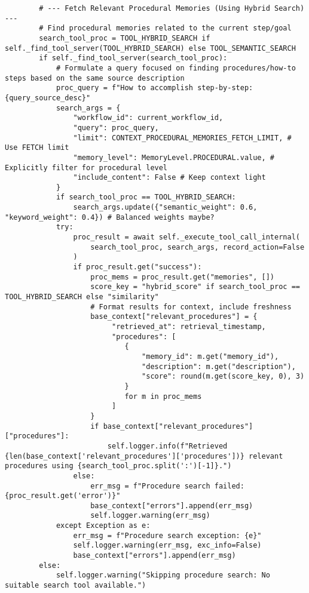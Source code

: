\documentclass[12pt,a4paper]{article}
\begin{document}
\begin{pageablecode}
\begin{verbatim}
        # --- Fetch Relevant Procedural Memories (Using Hybrid Search) ---
        # Find procedural memories related to the current step/goal
        search_tool_proc = TOOL_HYBRID_SEARCH if self._find_tool_server(TOOL_HYBRID_SEARCH) else TOOL_SEMANTIC_SEARCH
        if self._find_tool_server(search_tool_proc):
            # Formulate a query focused on finding procedures/how-to steps based on the same source description
            proc_query = f"How to accomplish step-by-step: {query_source_desc}"
            search_args = {
                "workflow_id": current_workflow_id,
                "query": proc_query,
                "limit": CONTEXT_PROCEDURAL_MEMORIES_FETCH_LIMIT, # Use FETCH limit
                "memory_level": MemoryLevel.PROCEDURAL.value, # Explicitly filter for procedural level
                "include_content": False # Keep context light
            }
            if search_tool_proc == TOOL_HYBRID_SEARCH:
                search_args.update({"semantic_weight": 0.6, "keyword_weight": 0.4}) # Balanced weights maybe?
            try:
                proc_result = await self._execute_tool_call_internal(
                    search_tool_proc, search_args, record_action=False
                )
                if proc_result.get("success"):
                    proc_mems = proc_result.get("memories", [])
                    score_key = "hybrid_score" if search_tool_proc == TOOL_HYBRID_SEARCH else "similarity"
                    # Format results for context, include freshness
                    base_context["relevant_procedures"] = {
                         "retrieved_at": retrieval_timestamp,
                         "procedures": [
                            {
                                "memory_id": m.get("memory_id"),
                                "description": m.get("description"),
                                "score": round(m.get(score_key, 0), 3)
                            }
                            for m in proc_mems
                         ]
                    }
                    if base_context["relevant_procedures"]["procedures"]:
                        self.logger.info(f"Retrieved {len(base_context['relevant_procedures']['procedures'])} relevant procedures using {search_tool_proc.split(':')[-1]}.")
                else:
                    err_msg = f"Procedure search failed: {proc_result.get('error')}"
                    base_context["errors"].append(err_msg)
                    self.logger.warning(err_msg)
            except Exception as e:
                err_msg = f"Procedure search exception: {e}"
                self.logger.warning(err_msg, exc_info=False)
                base_context["errors"].append(err_msg)
        else:
            self.logger.warning("Skipping procedure search: No suitable search tool available.")


\end{verbatim}
\end{pageablecode}
\end{document}
